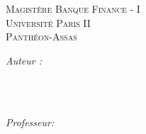 \begin{titlepage}
\setcounter{page}{0}
\newlength{\siderulewidth}\setlength{\siderulewidth}{25pt}




\newcommand{\HRulefill}{\noindent\makebox[\linewidth]{\rule{\paperwidth}{.1}}} %
\newcommand{\HRule}{\rule{\linewidth}{0.4pt}} %

\center %
 
\VRulefill
\textsc{\LARGE \uppercase{\doctitle}}\\[1.5cm] %
\ \\[5cm]
\textsc{ \huge \LARGE Magistère Banque Finance - I} \\[0.4cm] %
\textsc{\Large Université Paris II}\\[0.2cm] %
\textsc{\large Panthéon-Assas}\\[0.2cm] %

 

\begin{minipage}{0.4\textwidth}
\begin{flushleft} \large
\emph{Auteur :}\\
\docauthname\ \textsc{\docauthsurname} %
\end{flushleft}
\end{minipage}
~
\begin{minipage}{0.4\textwidth}
\begin{flushright} \large
\emph{Professeur:} \\
\docprofname\ \textsc{\docprofsurname} %
\end{flushright}
\end{minipage}\\[5.5cm]


\end{titlepage}
